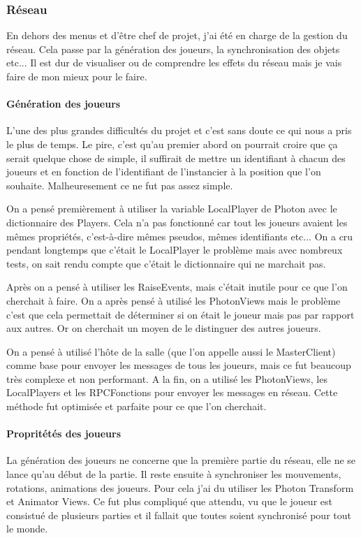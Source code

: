 \documentclass{article}
\begin{document}
\subsubsection{Réseau}
En dehors des menus et d'être chef de projet, j'ai été en charge de la gestion du réseau. Cela passe par la génération des joueurs, la synchronisation des objets 
etc... Il est dur de visualiser ou de comprendre les effets du réseau mais je vais faire de mon mieux pour le faire.

\paragraph{Génération des joueurs}

L'une des plus grandes difficultés du projet et c'est sans doute ce qui nous a pris le plus de temps. Le pire, c'est qu'au premier abord on pourrait croire que ça 
serait quelque chose de simple, il suffirait de mettre un identifiant à chacun des joueurs et en fonction de l'identifiant de l'instancier à la position que l'on 
souhaite. Malheuresement ce ne fut pas assez simple.

On a pensé premièrement à utiliser la variable LocalPlayer de Photon avec le dictionnaire des Players. Cela n'a 
pas fonctionné car tout les joueurs avaient les mêmes propriétés, c'est-à-dire mêmes pseudos, mêmes identifiants etc... On a cru pendant longtemps que c'était le 
LocalPlayer le problème mais avec nombreux tests, on sait rendu compte que c'était le dictionnaire qui ne marchait pas.

Après on a pensé à utiliser les RaiseEvents, mais c'était inutile pour ce que l'on cherchait à faire. On a après pensé à utilisé les PhotonViews mais le problème c'est 
que cela permettait de déterminer si on était le joueur mais pas par rapport aux autres. Or on cherchait un moyen de le distinguer des autres joueurs.

On a pensé à utilisé l'hôte de la salle (que l'on appelle aussi le MasterClient) comme base pour envoyer les messages de tous les joueurs, mais ce fut beaucoup très complexe et non 
performant. A la fin, on a utilisé les PhotonViews, les LocalPlayers et les RPCFonctions pour envoyer les messages en réseau. Cette méthode fut optimisée et parfaite 
pour ce que l'on cherchait.

\paragraph{Propritétés des joueurs}
La génération des joueurs ne concerne que la première partie du réseau, elle ne se lance qu'au début de la partie. Il reste ensuite à synchroniser les mouvements, 
rotations, animations des joueurs. Pour cela j'ai du utiliser les Photon Transform et Animator Views. Ce fut plus compliqué que attendu, vu que le joueur est consistué 
de plusieurs parties et il fallait que toutes soient synchronisé pour tout le monde. 
\end{document}
